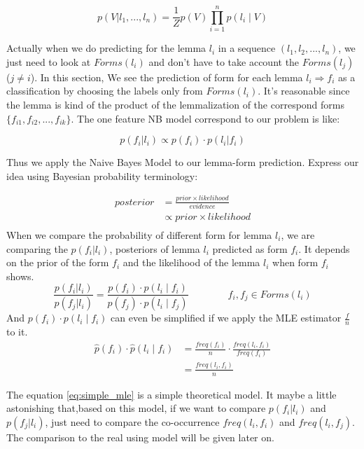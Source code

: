 \documentclass[a4paper]{article}
\begin{document}
\[p(V|l_1,...,l_n) = \frac{1}{Z} p(V) \prod _{i=1}^{n}p(l_i \mid V) \]

Actually when we do predicting for the lemma $l_i$ in a sequence $(l_1,l_2,...,l_n)$, we just need to look at $Forms(l_i)$ and don't have to take account the $Forms(l_j)$ ($j \neq i$). In this section, We see the prediction of form for each lemma $l_i  \Longrightarrow f_i$ as a classification by choosing the labels only from $Forms(l_i)$. It's reasonable since the lemma is kind of the product of the lemmalization of the correspond forms $\{f_{i1},f_{i2},...,f_{ik}\}$. The one feature NB model correspond to our problem is like:

\[p(f_i|l_i) \propto p(f_i) \cdot  p(l_i|f_i)\]

Thus we apply the Naive Bayes Model to our lemma-form prediction. Express our idea using Bayesian probability terminology:

\begin{align*}
posterior  &= \frac{prior \times likelihood}{evidence} \\
           &\propto  prior \times likelihood \\
\end{align*}
When we compare the probability of different form for lemma $l_i$, we are comparing the $p(f_i|l_i)$, posteriors  of lemma $l_i$ predicted as form $f_i$. It depends on the prior of the form $f_i$ and the likelihood of the lemma $l_i$ when form $f_i$ shows.
\begin{equation}
\frac{p(f_i|l_i)}{p(f_j|l_i)} = \frac{p(f_i) \cdot p(l_i \mid f_i)}{  p(f_j) \cdot p(l_i \mid f_j) } \qquad \qquad  f_i,f_j \in Forms(l_i)
\end{equation}
And $p(f_i) \cdot p(l_i \mid f_i)$ can even be simplified if we apply the MLE estimator $\frac{f}{n}$ to it.
\begin{equation} 
\label{eq:simple_mle}
\begin{aligned}
\hat{p}(f_i) \cdot \hat{p}(l_i \mid f_i) &= \frac{freq(f_i)}{n} \cdot \frac{freq(l_i, f_i)}{freq(f_i)} \\
&= \frac{freq(l_i, f_i)}{n}
\end{aligned}
\end{equation}

The equation \ref{eq:simple_mle} is a simple theoretical model. It maybe a little astonishing that,based on this model, if we want to compare $p(f_i|l_i)$ and $p(f_j|l_i)$, just need to compare the co-occurrence $freq(l_i,f_i)$ and $freq(l_i,f_j)$.  The comparison to the real using model will be given later on. 
\end{document}

